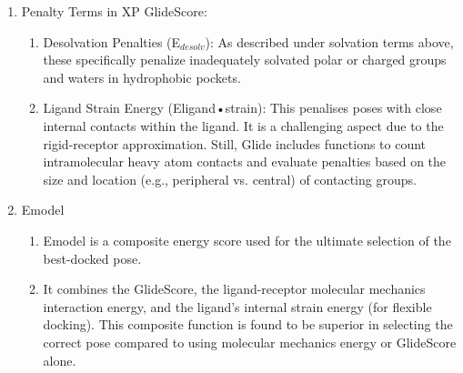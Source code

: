 \documentclass[11pt]{article}
\begin{document}
\begin{enumerate}
\begin{enumerate}
\begin{enumerate}
        \item Zwitterion ligands: For zwitterions, the long-range effects of solvation free energy are significantly reduced, making the formation of two salt bridges more favourable.
        \item Distinguishing between positive ligand/negative protein and vice versa.
        \item Strength of the electrostatic field at the ligand.
        \item Rewards for various motifs range from 0.5 to 4.7 kcal/mol.
        \end{enumerate}
    \item Pi-Stacking and Pi-Cation Interactions (EPI): These specialised terms, still under development, reward such interactions.
    \item Empirical Correction for Smaller Ligands: An empirical correction enhances the binding affinity of smaller ligands relative to larger ones.
         \end{enumerate}
\item Penalty Terms in XP GlideScore:
    \begin{enumerate}
    \item Desolvation Penalties (E$_{desolv}$): As described under solvation terms above, these specifically penalize inadequately solvated polar or charged groups and waters in hydrophobic pockets.
    \item Ligand Strain Energy (Eligand•strain): This penalises poses with close internal contacts within the ligand. It is a challenging aspect due to the rigid-receptor approximation. Still, Glide includes functions to count intramolecular heavy atom contacts and evaluate penalties based on the size and location (e.g., peripheral vs. central) of contacting groups.
    \end{enumerate}
    \item Emodel
    \begin{enumerate}
    \item Emodel is a composite energy score used for the ultimate selection of the best-docked pose.
    \item It combines the GlideScore, the ligand-receptor molecular mechanics interaction energy, and the ligand's internal strain energy (for flexible docking). This composite function is found to be superior in selecting the correct pose compared to using molecular mechanics energy or GlideScore alone.
    \end{enumerate}
\end{enumerate}
\end{document}
